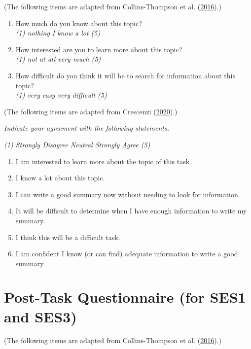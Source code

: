 \documentclass[letterpaper, nobind]{templates/ociamthesis}
\begin{document}
(The following items are adapted from Collins-Thompson et al. (\protect\hyperlink{ref-collins2016assessing}{2016}).)

\begin{enumerate}
\def\labelenumi{\arabic{enumi}.}
\item
  How much do you know about this topic?\\
  \emph{(1) nothing \textbar{} I know a lot (5)}
\item
  How interested are you to learn more about this topic?\\
  \emph{(1) not at all \textbar{} very much (5)}
\item
  How difficult do you think it will be to search for information
  about this topic?\\
  \emph{(1) very easy \textbar{} very difficult (5)}
\end{enumerate}

(The following items are adapted from Crescenzi (\protect\hyperlink{ref-crescenzi2020adaptation}{2020}).)

\emph{Indicate your agreement with the following statements.}

\emph{(1) Strongly Disagree \textbar{} Neutral \textbar{} Strongly Agree (5)}

\begin{enumerate}
\def\labelenumi{\arabic{enumi}.}
\setcounter{enumi}{3}
\item
  I am interested to learn more about the topic of this task.
\item
  I know a lot about this topic.
\item
  I can write a good summary now without needing to look for
  information.
\item
  It will be difficult to determine when I have enough information to
  write my summary.
\item
  I think this will be a difficult task.
\item
  I am confident I know (or can find) adequate information to write a
  good summary.
\end{enumerate}

\hypertarget{app-phase13-posttask}{%
\section{Post-Task Questionnaire (for SES1 and SES3)}\label{app-phase13-posttask}}

(The following items are adapted from Collins-Thompson et al. (\protect\hyperlink{ref-collins2016assessing}{2016}).)
\end{document}
